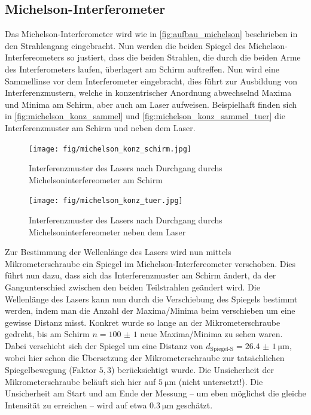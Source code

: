 \documentclass[ngerman]{scrartcl}
\begin{document}
\subsection{Michelson-Interferometer}
\label{sec:durchfuehrung_michelson}

Das Michelson-Interferometer wird wie in \autoref{fig:aufbau_michelson} beschrieben in den Strahlengang eingebracht. Nun werden die beiden Spiegel des Michelson-Interfereometers so justiert, dass die beiden Strahlen, die durch die beiden Arme des Interferometers laufen, überlagert am Schirm auftreffen. Nun wird eine Sammellinse vor dem Interferometer eingebracht, dies führt zur Ausbildung von Interferenzmustern, welche in konzentrischer Anordnung abwechselnd Maxima und Minima am Schirm, aber auch am Laser aufweisen. Beispielhaft finden sich in \autoref{fig:michelson_konz_sammel} und \autoref{fig:michelson_konz_sammel_tuer} die Interferenzmuster am Schirm und neben dem Laser.

\setcapindent{0pt}
\begin{figure}[H]
    \centering
    \begin{minipage}[t]{0.45\linewidth}
        \centering
        \texttt{[image: fig/michelson\_konz\_schirm.jpg]}
        \caption{Interferenzmuster des Lasers nach Durchgang durchs Michelsoninterfereometer am Schirm}
        \label{fig:michelson_konz_sammel}
    \end{minipage}%
    \hspace*{\fill}
    \begin{minipage}[t]{0.45\linewidth}
        \centering
        \texttt{[image: fig/michelson\_konz\_tuer.jpg]}
        \caption{Interferenzmuster des Lasers nach Durchgang durchs Michelsoninterfereometer neben dem Laser}
        \label{fig:michelson_konz_sammel_tuer}
    \end{minipage}
\end{figure}
\setcaphanging

Zur Bestimmung der Wellenlänge des Lasers wird nun mittels Mikrometerschraube ein Spiegel im Michelson-Interfereometer verschoben. Dies führt nun dazu, dass sich das Interferenzmuster am Schirm ändert, da der Gangunterschied zwischen den beiden Teilstrahlen geändert wird. Die Wellenlänge des Lasers kann nun durch die Verschiebung des Spiegels bestimmt werden, indem man die Anzahl der Maxima/Minima beim verschieben um eine gewisse Distanz misst. Konkret wurde so lange an der Mikrometerschraube gedreht, bis am Schirm $n = \num{100(1)}$ neue Maxima/Minima zu sehen waren. Dabei verschiebt sich der Spiegel um eine Distanz von $d_\text{Spiegel-S} = \SI{26.4(10)}{\micro\meter}$, wobei hier schon die Übersetzung der Mikrometerschraube zur tatsächlichen Spiegelbewegung (Faktor $5,3$) berücksichtigt wurde. Die Unsicherheit der Mikrometerschraube beläuft sich hier auf $\SI{5}{\micro\meter}$ (nicht untersetzt!). Die Unsicherheit am Start und am Ende der Messung -- um eben möglichst die gleiche Intensität zu erreichen -- wird auf etwa $\SI{0.3}{\micro\meter}$ geschätzt.
\end{document}

